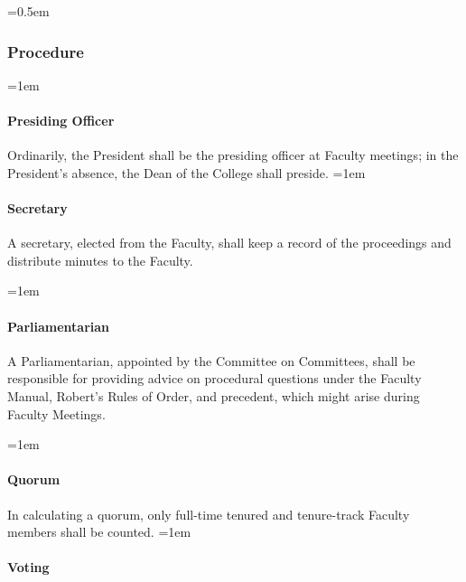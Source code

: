 \documentclass{manual}
\let\oldsubsubsection\subsubsection
\renewcommand\subsubsection{\leftskip=0.5em\oldsubsubsection}
\let\oldparagraph\paragraph
\renewcommand\paragraph{\leftskip=1em\oldparagraph}
\begin{document}
\subsubsection{Procedure} \label{sub:Procedure}
\paragraph{Presiding Officer}
Ordinarily, the President shall be the presiding officer at Faculty meetings; in the President's absence, the Dean of the College shall preside.
\paragraph{Secretary}
A secretary, elected from the Faculty, shall keep a record of the proceedings and distribute minutes to the Faculty.

\paragraph{Parliamentarian}
A Parliamentarian, appointed by the Committee on Committees, shall be responsible for providing advice on procedural questions under the Faculty Manual, Robert's Rules of Order, and precedent, which might arise during Faculty Meetings.

\paragraph{Quorum}
In calculating a quorum, only full-time tenured and tenure-track Faculty members shall be counted. 
\paragraph{Voting} \label{par:Voting}
\end{document}
